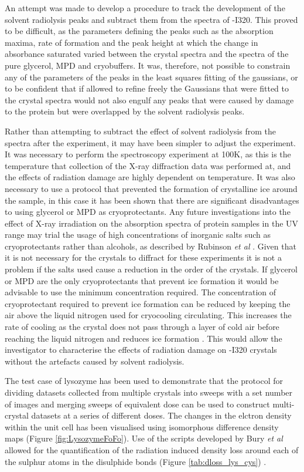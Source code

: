 An attempt was made to develop a procedure to track the development of the solvent radiolysis peaks and subtract them from the spectra of \atpdx -I320. This proved to be difficult, as the parameters defining the peaks such as the absorption maxima, rate of formation and the peak height at which the change in absorbance saturated varied between the crystal spectra and the spectra of the pure glycerol, MPD and cryobuffers. It was, therefore, not possible to constrain any of the parameters of the peaks in the least squares fitting of the gaussians, or to be confident that if allowed to refine freely the Gaussians that were fitted to the crystal spectra would not also engulf any peaks that were caused by damage to the protein but were overlapped by the solvent radiolysis peaks. 

Rather than attempting to subtract the effect of solvent radiolysis from the spectra after the experiment, it may have been simpler to adjust the experiment. It was necessary to perform the spectroscopy experiment at 100K, as this is the temperature that collection of the X-ray diffraction data was performed at, and the effects of radiation damage are highly dependent on temperature. It was also necessary to use a protocol that prevented the formation of crystalline ice around the sample, in this case it has been shown that there are significant disadvantages to using glycerol or MPD as cryoprotectants. Any future investigations into the effect of X-ray irradiation on the absorption spectra of protein samples in the UV range may trial the usage of high concentrations of inorganic salts such as cryoprotectants rather than alcohols, as described by Rubinson \textit{et al} \cite{Rubinson2000}. Given that it is not necessary for the crystals to diffract for these experiments it is not a problem if the salts used cause a reduction in the order of the crystals. If glycerol or MPD are the only cryoprotectants that prevent ice formation it would be advisable to use the minimum concentration required. The concentration of cryoprotectant required to prevent ice formation can be reduced by keeping the air above the liquid nitrogen used for cryocooling circulating. This increases the rate of cooling as the crystal does not pass through a layer of cold air before reaching the liquid nitrogen and reduces ice formation \cite{Warkentin2010}. This would allow the investigator to characterise the effects of radiation damage on \atpdx -I320 crystals without the artefacts caused by solvent radiolysis.        

The test case of lysozyme has been used to demonstrate that the protocol for dividing datasets collected from multiple crystals into sweeps with a set number of images and merging sweeps of equivalent dose can be used to construct multi-crystal datasets at a series of different doses. The changes in the elctron density within the unit cell has been visualised using isomorphous difference density maps (Figure \ref{fig:LysozymeFoFo}). Use of the scripts developed by Bury \textit{et al} allowed for the quantification of the radiation induced density loss around each of the sulphur atoms in the disulphide bonds (Figure \ref{tab:dloss_lys_cys}) \cite{Bury2016}. 

